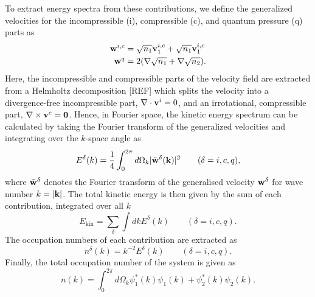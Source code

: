 To extract energy spectra from these contributions, we define the generalized
velocities for the incompressible (i), compressible (c), and quantum pressure
(q) parts as
\begin{equation}
    \begin{aligned}
        \vb{w}^{i, c} &= \sqrt{n_1}\vb{v}_1^{i, c} + \sqrt{n_1}\vb{v}_1^{i, c}
        \\
        \vb{w}^q &= 2 (\nabla \sqrt{n_1} + \nabla \sqrt{n_2}).
    \end{aligned}
\end{equation}
Here, the incompressible and compressible parts of the velocity field are
extracted from a Helmholtz decomposition [REF] which splits the velocity into a 
divergence-free incompressible part, \(\nabla \cdot \vb{v}^i = 0\), and an 
irrotational, compressible part, \(\nabla \times \vb{v}^c=\vb{0}\).
Hence, in Fourier space, the kinetic energy spectrum can be calculated by
taking the Fourier transform of the generalized velocities and integrating over
the \(k\)-space angle as
\begin{equation}
    E^\delta(k) = \frac{1}{4} \int_{0}^{2\pi} d\Omega_k
    |\tilde{\vb{w}}^\delta(\vb{k})|^2
    \qquad (\delta = i, c, q),
\end{equation}
where \(\tilde{\vb{w}}^\delta \) denotes the Fourier transform of the generalised
velocity \(\vb{w}^\delta \) for wave number \(k=|\vb{k}|\).
The total kinetic energy is then given by the sum of each contribution,
integrated over all \(k\)
\begin{equation}
    E_\mathrm{kin} = \sum_\delta \int dk E^\delta (k) \qquad (\delta = i, c, q).
\end{equation}
The occupation numbers of each contribution are extracted as
\begin{equation}
    n^\delta(k) = k^{-2}E^\delta(k) \qquad (\delta = i, c, q).
\end{equation}
Finally, the total occupation number of the system is given as
\begin{equation}
    n(k) = \int_{0}^{2\pi} d\Omega_k \psi_1^*(k)\psi_1(k) 
    + \psi_2^*(k)\psi_2(k).
\end{equation}

